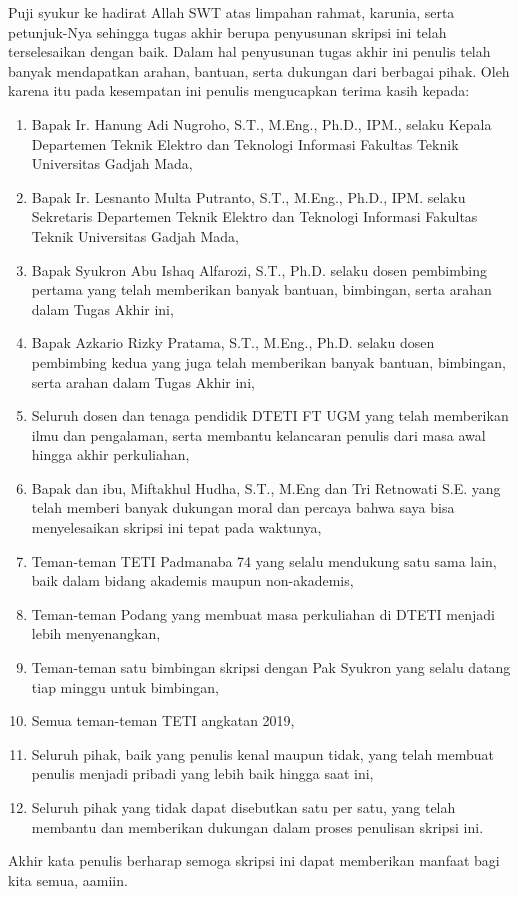 Puji syukur ke hadirat Allah SWT atas limpahan rahmat, karunia, serta petunjuk-Nya sehingga tugas akhir berupa penyusunan skripsi ini telah terselesaikan
dengan baik. Dalam hal penyusunan tugas akhir ini penulis telah banyak mendapatkan arahan, bantuan, serta dukungan dari berbagai pihak. Oleh karena itu pada
kesempatan ini penulis mengucapkan terima kasih kepada:

\begin{enumerate}
	\item Bapak Ir. Hanung Adi Nugroho, S.T., M.Eng., Ph.D., IPM., selaku Kepala Departemen Teknik Elektro dan Teknologi Informasi Fakultas Teknik Universitas Gadjah
	      Mada,

	\item Bapak Ir. Lesnanto Multa Putranto, S.T., M.Eng., Ph.D., IPM. selaku Sekretaris Departemen Teknik Elektro dan Teknologi Informasi Fakultas Teknik Universitas
	      Gadjah Mada,

	\item Bapak Syukron Abu Ishaq Alfarozi, S.T., Ph.D. selaku dosen pembimbing pertama yang telah memberikan banyak bantuan, bimbingan, serta arahan dalam Tugas Akhir
	      ini,

	\item Bapak Azkario Rizky Pratama, S.T., M.Eng., Ph.D. selaku dosen pembimbing kedua yang juga telah memberikan banyak bantuan, bimbingan, serta arahan dalam Tugas
	      Akhir ini,
	\item Seluruh dosen dan tenaga pendidik DTETI FT UGM yang telah memberikan ilmu dan pengalaman, serta membantu kelancaran penulis dari masa awal hingga akhir
	      perkuliahan,

	\item Bapak dan ibu, Miftakhul Hudha, S.T., M.Eng dan Tri Retnowati S.E. yang telah memberi banyak dukungan moral dan percaya bahwa saya bisa menyelesaikan skripsi
	      ini tepat pada waktunya,

	\item Teman-teman TETI Padmanaba 74 yang selalu mendukung satu sama lain, baik dalam bidang akademis maupun non-akademis,
	\item Teman-teman Podang yang membuat masa perkuliahan di DTETI menjadi lebih menyenangkan,
	\item Teman-teman satu bimbingan skripsi dengan Pak Syukron yang selalu datang tiap minggu untuk bimbingan,
	\item Semua teman-teman TETI angkatan 2019,
	\item Seluruh pihak, baik yang penulis kenal maupun tidak, yang telah membuat penulis menjadi pribadi yang lebih baik hingga saat ini,
	\item Seluruh pihak yang tidak dapat disebutkan satu per satu, yang telah membantu dan memberikan dukungan dalam proses penulisan skripsi ini.

\end{enumerate}

Akhir kata penulis berharap semoga skripsi ini dapat memberikan manfaat bagi kita semua, aamiin.

